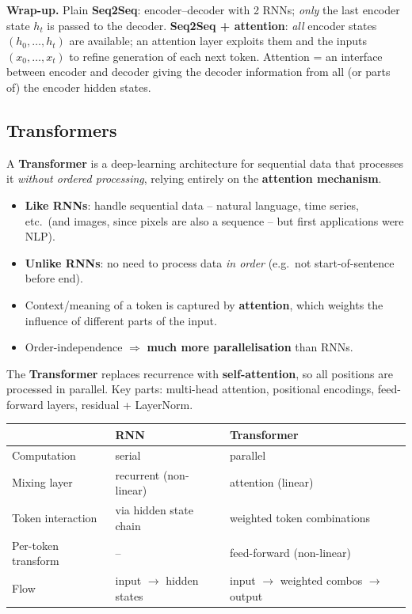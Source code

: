 \documentclass[10pt,a4paper]{article}
\begin{document}
	\begin{importantbox}
		\textbf{Wrap-up.} Plain \textbf{Seq2Seq}: encoder--decoder with 2 RNNs; \emph{only} the last encoder state $h_t$ is passed to the decoder. \textbf{Seq2Seq + attention}: \emph{all} encoder states $(h_0,\dots,h_t)$ are available; an attention layer exploits them and the inputs $(x_0,\dots,x_t)$ to refine generation of each next token. Attention = an interface between encoder and decoder giving the decoder information from all (or parts of) the encoder hidden states.
	\end{importantbox}

	\subsection{Transformers}

	\begin{definitionbox}
		A \textbf{Transformer} is a deep-learning architecture for sequential data that processes it \emph{without ordered processing}, relying entirely on the \textbf{attention mechanism}.
	\end{definitionbox}

	\begin{itemize}[leftmargin=*]
		\item \textbf{Like RNNs}: handle sequential data -- natural language, time series, etc.\ (and images, since pixels are also a sequence -- but first applications were NLP).
		\item \textbf{Unlike RNNs}: no need to process data \emph{in order} (e.g.\ not start-of-sentence before end).
		\item Context/meaning of a token is captured by \textbf{attention}, which weights the influence of different parts of the input.
		\item Order-independence $\Rightarrow$ \textbf{much more parallelisation} than RNNs.
	\end{itemize}

	\begin{importantbox}
		The \textbf{Transformer} replaces recurrence with \textbf{self-attention}, so all positions are processed in parallel. Key parts: multi-head attention, positional encodings, feed-forward layers, residual + LayerNorm.
	\end{importantbox}

	\begin{center}
	\begin{tabular}{@{}lll@{}}
		\toprule
		& \textbf{RNN} & \textbf{Transformer} \\
		\midrule
		Computation & serial & parallel \\
		Mixing layer & recurrent (non-linear) & attention (linear) \\
		Token interaction & via hidden state chain & weighted token combinations \\
		Per-token transform & -- & feed-forward (non-linear) \\
		Flow & input $\to$ hidden states & input $\to$ weighted combos $\to$ output \\
		\bottomrule
	\end{tabular}
	\end{center}
\end{document}
